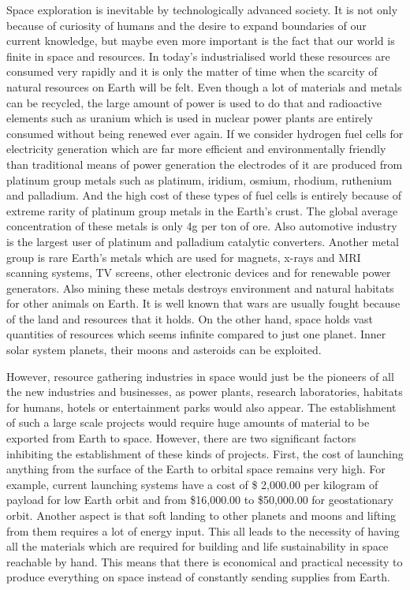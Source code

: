 \documentclass[12pt]{article}
\begin{document}
Space exploration is inevitable by technologically advanced society. It is not only because of curiosity of humans and the desire to expand boundaries of our current knowledge, but maybe even more important is the fact that our world is finite in space and resources. In today’s industrialised world these resources are consumed very rapidly and it is only the matter of time when the scarcity of natural resources on Earth will be felt. Even though a lot of materials and
metals can be recycled, the large amount of power is used to do that and radioactive elements such as uranium which is used in nuclear power plants are entirely consumed without being renewed ever again. If we consider hydrogen fuel cells for electricity generation which are far more efficient and environmentally friendly than traditional means of power generation the electrodes of it are produced from platinum group metals such as platinum, iridium, osmium, rhodium, ruthenium and palladium. And the high cost of these types of fuel cells is entirely because of extreme rarity of platinum group metals in the Earth’s crust. The global average concentration of these metals is only 4g per ton of ore. Also automotive industry is the largest
user of platinum and palladium catalytic converters. Another metal group is rare Earth's metals which are used for magnets, x-rays and MRI scanning systems, TV screens, other electronic devices and for renewable power generators. Also mining these metals destroys environment and natural habitats for other animals on Earth. It is well known that wars are usually fought because of the land and resources that it holds. On the other hand, space holds vast quantities of
resources which seems infinite compared to just one planet. Inner solar system planets, their moons and asteroids can be exploited.

However, resource gathering industries in space would just be the pioneers of all the new industries and businesses, as power plants, research laboratories, habitats for humans, hotels or entertainment parks would also appear. The establishment of such a large scale projects would require huge amounts of material to be exported from Earth to space. However, there are two significant factors inhibiting the establishment of these kinds of projects. First, the cost of launching anything from the surface of the Earth to orbital space remains very high. For example, current launching systems have a cost of \$ 2,000.00 per kilogram of payload for low Earth orbit and from \$16,000.00 to \$50,000.00 for geostationary orbit. Another aspect is that soft landing to other planets and moons and lifting from them requires a lot of energy input. This all leads to the necessity of having all the materials which are required for building and life sustainability in space reachable by hand. This means that there is economical and practical necessity to produce everything on space instead of constantly sending supplies from Earth.
\end{document}
